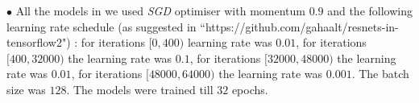 \indent \quad $\bullet$ All the models in  we used \emph{SGD} optimiser with momentum $0.9$ and the following learning rate schedule (as suggested in ``https://github.com/gahaalt/resnets-in-tensorflow2") : for iterations $[0, 400)$ learning rate was $0.01$,  for iterations $[400, 32000)$ the learning rate was $ 0.1$, for iterations $[32000, 48000)$ the learning rate was $0.01$, for iterations $[48000, 64000)$ the learning rate was $0.001$. The batch size was $128$. The models were trained till $32$ epochs.
\begin{comment}
\begin{figure}
\centering
\begin{minipage}{0.48\columnwidth}
\centering
\resizebox{0.99\columnwidth}{!}{

}
\end{minipage}
\begin{minipage}{0.48\columnwidth}
\centering
\resizebox{0.99\columnwidth}{!}{

}
\end{minipage}

\begin{minipage}{0.48\columnwidth}
\centering
\resizebox{0.99\columnwidth}{!}{

}
\end{minipage}
\begin{minipage}{0.48\columnwidth}
\centering
\resizebox{0.99\columnwidth}{!}{

}
\end{minipage}


\begin{minipage}{0.48\columnwidth}
\centering
\resizebox{0.99\columnwidth}{!}{

}
\end{minipage}
\begin{minipage}{0.48\columnwidth}
\centering
\resizebox{0.99\columnwidth}{!}{

}
\end{minipage}



\begin{minipage}{0.48\columnwidth}
\centering
\resizebox{0.99\columnwidth}{!}{

}
\end{minipage}
\begin{minipage}{0.48\columnwidth}
\centering
\resizebox{0.99\columnwidth}{!}{

}
\end{minipage}

\begin{minipage}{0.48\columnwidth}
\centering
\resizebox{0.99\columnwidth}{!}{

}
\end{minipage}
\begin{minipage}{0.48\columnwidth}
\centering
\resizebox{0.99\columnwidth}{!}{

}
\end{minipage}


\end{comment}

